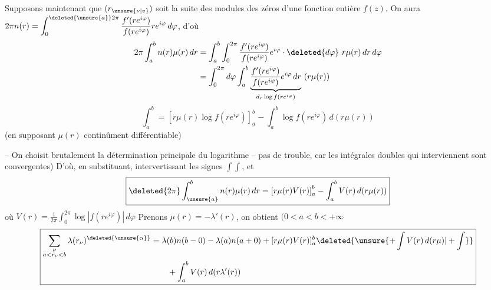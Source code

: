 Supposons maintenant que $(r_{\unsure{\nu|v}})$ soit la suite des
modules des zéros d'une fonction entière $f(z)$.
On aura $\displaystyle 2\pi n(r)=\int_0^{\deleted{\unsure{a}}2\pi}\frac{f'(re^{i\varphi})}{f(re^{i\varphi})}re^{i\varphi}\,d\varphi$, d'où
\[ \begin{aligned} 2\pi\int_a^b n(r)\mu(r)\,dr
&=\int_a^b\int_0^{2\pi}\frac{f'(re^{i\varphi})}{f(re^{i\varphi})}e^{i\varphi}\cdot\deleted{d\varphi}\ r\mu(r)\,dr\,d\varphi\\
&=\int_0^{2\pi}d\varphi\int_a^b\underbrace{\frac{f'(re^{i\varphi})}{f(re^{i\varphi})}e^{i\varphi}\,dr}_{d_r\log f(re^{i\varphi})}\ (r\mu(r)) \end{aligned} \]
\[ \int_a^b=\left[r\mu(r)\log f(re^{i\varphi})\right]_a^b-\int_a^b\log f(re^{i\varphi})\,d(r\mu(r)) \]
(en supposant $\mu(r)$ continûment différentiable)

-- On choisit brutalement la détermination
principale du logarithme -- pas de trouble,
car les intégrales  doubles
qui interviennent sont convergentes)
D'où, en substituant, intervertissant les signes $\int\!\int$, et
\[ \boxed{\displaystyle \deleted{2\pi}\int_{\unsure{a}}^b n(r)\mu(r)\,dr=\left[r\mu(r)V(r)\right]_a^b-\int_a^b V(r)\,d(r\mu(r))} \]
où \qquad \uline{$\displaystyle V(r)=\frac1{2\pi}\int_0^{2\pi}\log|f(re^{i\varphi})|\,d\varphi$}
Prenons $\mu(r)=-\lambda'(r)$, on obtient \enspace $(0<a<b<+\infty$
\[ \boxed{\begin{aligned}\sum_{\substack{\nu\\a<r_\nu<b}}\lambda(r_\nu)^{\deleted{\unsure{\alpha}}}&=\lambda(b)n(b-0)-\lambda(a)n(a+0)+[r\mu(r)V(r)]_a^b\deleted{\unsure{+\int V(r)\,d(r\mu)|+\int}}\\
&\qquad+\int_a^b V(r)\,d(r\lambda'(r))\end{aligned}} \]
